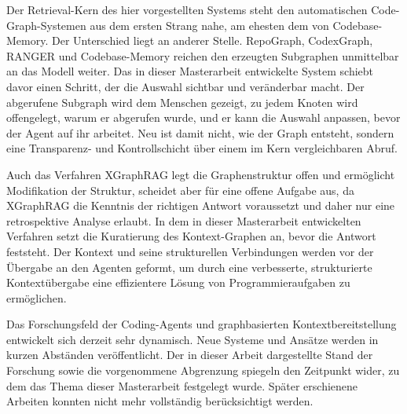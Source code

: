 Der Retrieval-Kern des hier vorgestellten Systems steht den automatischen Code-Graph-Systemen aus dem ersten Strang nahe, am ehesten dem von Codebase-Memory. Der Unterschied liegt an anderer Stelle. RepoGraph, CodexGraph, RANGER und Codebase-Memory reichen den erzeugten Subgraphen unmittelbar an das Modell weiter. Das in dieser Masterarbeit entwickelte System schiebt davor einen Schritt, der die Auswahl sichtbar und veränderbar macht. Der abgerufene Subgraph wird dem Menschen gezeigt, zu jedem Knoten wird offengelegt, warum er abgerufen wurde, und er kann die Auswahl anpassen, bevor der Agent auf ihr arbeitet. Neu ist damit nicht, wie der Graph entsteht, sondern eine Transparenz- und Kontrollschicht über einem im Kern vergleichbaren Abruf.

Auch das Verfahren XGraphRAG legt die Graphenstruktur offen und ermöglicht Modifikation der Struktur, scheidet aber für eine offene Aufgabe aus, da XGraphRAG die Kenntnis der richtigen Antwort voraussetzt und daher nur eine retrospektive Analyse erlaubt. In dem in dieser Masterarbeit entwickelten Verfahren setzt die Kuratierung des Kontext-Graphen an, bevor die Antwort feststeht. Der Kontext und seine strukturellen Verbindungen werden vor der Übergabe an den Agenten geformt, um durch eine verbesserte, strukturierte Kontextübergabe eine effizientere Lösung von Programmieraufgaben zu ermöglichen.

\bigskip

Das Forschungsfeld der Coding-Agents und graphbasierten Kontextbereitstellung entwickelt sich derzeit sehr dynamisch. Neue Systeme und Ansätze werden in kurzen Abständen veröffentlicht. Der in dieser Arbeit dargestellte Stand der Forschung sowie die vorgenommene Abgrenzung spiegeln den Zeitpunkt wider, zu dem das Thema dieser Masterarbeit festgelegt wurde. Später erschienene Arbeiten konnten nicht mehr vollständig berücksichtigt werden.
